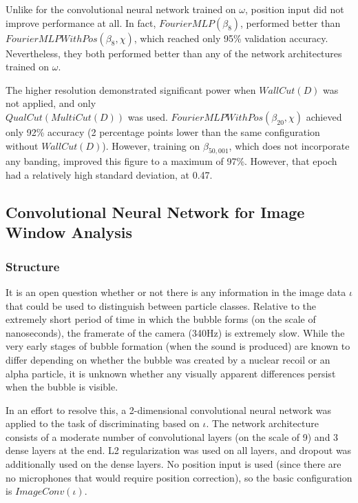 \documentclass[10pt]{article}
\begin{document}
Unlike for the convolutional neural network trained on $\omega$, position input did not improve performance at all. In fact, $FourierMLP(\beta_{8})$, performed better than $FourierMLPWithPos(\beta_{8}, \chi)$, which reached only 95\% validation accuracy. Nevertheless, they both performed better than any of the network architectures trained on $\omega$.

The higher resolution demonstrated significant power when $WallCut(D)$ was not applied, and only \\ $QualCut(MultiCut(D))$ was used. $FourierMLPWithPos(\beta_{20}, \chi)$ achieved only 92\% accuracy (2 percentage points lower than the same configuration without $WallCut(D)$). However, training on $\beta_{50,001}$, which does not incorporate any banding, improved this figure to a maximum of 97\%. However, that epoch had a relatively high standard deviation, at 0.47.

\subsection{Convolutional Neural Network for Image Window Analysis}

\subsubsection{Structure}

It is an open question whether or not there is any information in the image data $\iota$ that could be used to distinguish between particle classes. Relative to the extremely short period of time in which the bubble forms (on the scale of nanoseconds), the framerate of the camera (340Hz) is extremely slow. While the very early stages of bubble formation (when the sound is produced) are known to differ depending on whether the bubble was created by a nuclear recoil or an alpha particle, it is unknown whether any visually apparent differences persist when the bubble is visible.

In an effort to resolve this, a 2-dimensional convolutional neural network was applied to the task of discriminating based on $\iota$. The network architecture consists of a moderate number of convolutional layers (on the scale of 9) and 3 dense layers at the end. L2 regularization was used on all layers, and dropout was additionally used on the dense layers. No position input is used (since there are no microphones that would require position correction), so the basic configuration is $ImageConv(\iota)$.
\end{document}
